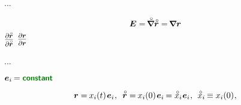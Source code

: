 ...

\nopagebreak\vspace{-0.2em}\begin{equation*}
\UnitDyad
= \tikzmark{unitTensorAsOriginalDerivativeBegin} \hspace{-0.25ex} \boldnablacircled \initiallocationvector \tikzmark{unitTensorAsOriginalDerivativeEnd}
= \tikzmark{unitTensorAsCurrentDerivativeBegin} \hspace{-0.25ex} \boldnabla \currentlocationvector \tikzmark{unitTensorAsCurrentDerivativeEnd}
\end{equation*}%
%
{${ \scalebox{0.8}{$ \displaystyle \frac{\raisemath{-0.2em}{\partial \initiallocationvector}}{\partial \initiallocationvector} $} }$}%
%
{${ \scalebox{0.8}{$ \displaystyle \frac{\raisemath{-0.2em}{\partial \currentlocationvector}}{\partial \currentlocationvector} $} }$}

...

  ${\bm{e}_i \hspace{-0.16ex} = \boldconstant}$

\nopagebreak\vspace{-0.2em}\begin{equation*}
\currentlocationvector = \hspace{-0.15ex} x_{i}(t) \hspace{.2ex} \bm{e}_i
\hspace{.1ex} , \:\;
\initiallocationvector = \hspace{-0.15ex} x_{i}(0) \hspace{.2ex} \bm{e}_i \hspace{-0.16ex} = \mathcircabove{x}_i \hspace{.1ex} \bm{e}_i
\hspace{.1ex} , \:\:
\mathcircabove{x}_i \hspace{-0.15ex} \equiv x_{i}(0)
\hspace{.1ex} ,
\end{equation*}

